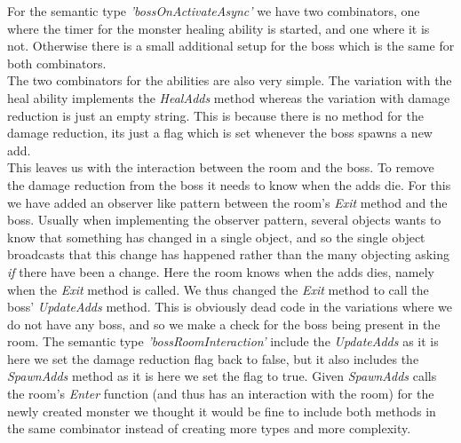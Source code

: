 For the semantic type \textit{'bossOnActivateAsync'} we have two combinators, one where the timer for the monster healing ability is started, and one where it is not. Otherwise there is a small additional setup for the boss which is the same for both combinators.\\
The two combinators for the abilities are also very simple. The variation with the heal ability implements the \textit{HealAdds} method whereas the variation with damage reduction is just an empty string. This is because there is no method for the damage reduction, its just a flag which is set whenever the boss spawns a new add.\\
This leaves us with the interaction between the room and the boss. To remove the damage reduction from the boss it needs to know when the adds die. For this we have added an observer like pattern between the room's \textit{Exit} method and the boss. Usually when implementing the observer pattern, several objects wants to know that something has changed in a single object, and so the single object broadcasts that this change has happened rather than the many objecting asking \textit{if} there have been a change. Here the room knows when the adds dies, namely when the \textit{Exit} method is called. We thus changed the \textit{Exit} method to call the boss' \textit{UpdateAdds} method. This is obviously dead code in the variations where we do not have any boss, and so we make a check for the boss being present in the room. The semantic type \textit{'bossRoomInteraction'} include the \textit{UpdateAdds} as it is here we set the damage reduction flag back to false, but it also includes the \textit{SpawnAdds} method as it is here we set the flag to true. Given \textit{SpawnAdds} calls the room's \textit{Enter} function (and thus has an interaction with the room) for the newly created monster we thought it would be fine to include both methods in the same combinator instead of creating more types and more complexity.\\
